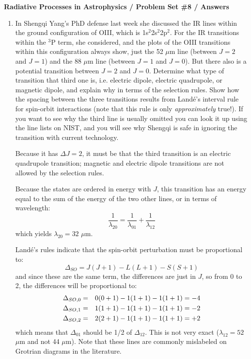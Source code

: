 \documentclass[11pt, preprint]{article}
\begin{document}
\begin{center}
  {\bf Radiative Processes in Astrophysics / Problem Set \#8 /
    Answers}
\end{center}

\begin{enumerate}
\item In Shengqi Yang's PhD defense last week she discussed the IR
  lines within the ground configuration of OIII, which is
  1s$^2$2s$^2$2p$^2$. For the IR transitions within the ${}^3$P term,
  she considered, and the plots of the OIII transitions within this
  configuration always show, just the 52 $\mu$m line (between $J=2$
  and $J=1$) and the 88 $\mu$m line (between $J=1$ and $J=0$). But
  there also is a potential transition between $J=2$ and
  $J=0$. Determine what type of transition that third one is,
  i.e. electric dipole, electric quadrupole, or magnetic dipole, and
  explain why in terms of the selection rules. Show how the spacing
  between the three transitions results from Land\'e's interval rule
  for spin-orbit interactions (note that this rule is only {\it
    approximately} true!). If you want to see why the third line
  is usually omitted you can look it up using the line lists on NIST,
  and you will see why Shengqi is safe in ignoring the transition with
  current technology.

  \begin{answer}
    Because it has $\Delta J = 2$, it must be that the third
    transition is an electric quadrupole transition; magnetic and
    electric dipole transitions are not allowed by the selection
    rules.

    Because the states are ordered in energy with $J$, this
    transition has an energy equal to the sum of the energy of the two
    other lines, or in terms of wavelength:
    \begin{equation}
      \frac{1}{\lambda_{20}} = \frac{1}{\lambda_{01}} +
        \frac{1}{\lambda_{12}}
    \end{equation}
    which yields $\lambda_{20} = 32$ $\mu$m.

    Land\'e's rules indicate that the spin-orbit perturbation must be
    proportional to:
    \begin{equation}
      \Delta_{SO} = J(J+1) -  L(L+1) - S(S+1)
    \end{equation}
    and since these are the same term, the differences are just in
    $J$, so from 0 to 2, the differences will be proportional to:
    \begin{eqnarray}
      \Delta_{SO, 0} &=& 0(0+1) -  1(1+1) - 1(1+1) = -4 \cr
      \Delta_{SO, 1} &=& 1(1+1) -  1(1+1) - 1(1+1) = -2 \cr
      \Delta_{SO, 2} &=& 2(2+1) -  1(1+1) - 1(1+1) = +2
    \end{eqnarray}
    which means that $\Delta_{01}$ should be 1/2 of $\Delta_{12}$. This
    is not very exact ($\lambda_{12} = 52$ $\mu$m and not 44 $\mu$m).
    Note that these lines are commonly mislabeled on Grotrian diagrams
    in the literature.
    

\end{answer}
\end{enumerate}
\end{document}
